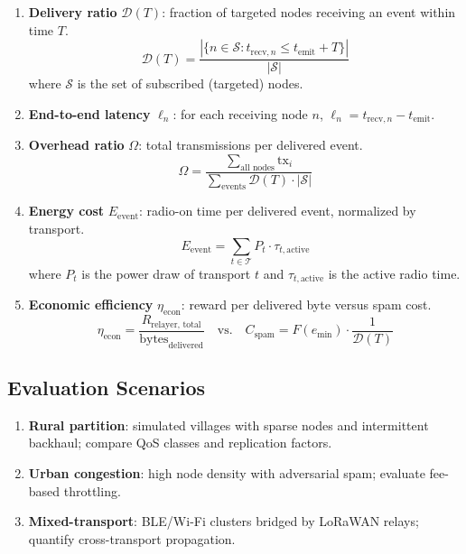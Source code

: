 \documentclass[11pt,a4paper]{article}
\begin{document}
\begin{enumerate}[nosep]
  \item \textbf{Delivery ratio} $\mathcal{D}(T)$: fraction of targeted nodes receiving an event within time $T$.
  \begin{equation}
    \mathcal{D}(T) = \frac{|\{n \in \mathcal{S} : t_{\text{recv},n} \leq t_{\text{emit}} + T\}|}{|\mathcal{S}|}
    \label{eq:delivery_ratio}
  \end{equation}
  where $\mathcal{S}$ is the set of subscribed (targeted) nodes.
  
  \item \textbf{End-to-end latency} $\ell_n$: for each receiving node $n$, $\ell_n = t_{\text{recv},n} - t_{\text{emit}}$.
  
  \item \textbf{Overhead ratio} $\Omega$: total transmissions per delivered event.
  \begin{equation}
    \Omega = \frac{\sum_{\text{all nodes}} \text{tx}_i}{\sum_{\text{events}} \mathcal{D}(T) \cdot |\mathcal{S}|}
    \label{eq:overhead}
  \end{equation}
  
  \item \textbf{Energy cost} $E_{\text{event}}$: radio-on time per delivered event, normalized by transport.
  \begin{equation}
    E_{\text{event}} = \sum_{t \in \mathcal{T}} P_t \cdot \tau_{t,\text{active}}
    \label{eq:energy}
  \end{equation}
  where $P_t$ is the power draw of transport $t$ and $\tau_{t,\text{active}}$ is the active radio time.
  
  \item \textbf{Economic efficiency} $\eta_{\text{econ}}$: reward per delivered byte versus spam cost.
  \begin{equation}
    \eta_{\text{econ}} = \frac{R_{\text{relayer, total}}}{\text{bytes}_{\text{delivered}}} \quad \text{vs.} \quad C_{\text{spam}} = F(e_{\text{min}}) \cdot \frac{1}{\mathcal{D}(T)}
    \label{eq:econ_efficiency}
  \end{equation}
\end{enumerate}

\subsection{Evaluation Scenarios}
\begin{enumerate}[nosep]
  \item \textbf{Rural partition}: simulated villages with sparse nodes and intermittent backhaul; compare QoS classes and replication factors.
  \item \textbf{Urban congestion}: high node density with adversarial spam; evaluate fee-based throttling.
  \item \textbf{Mixed-transport}: BLE/Wi-Fi clusters bridged by LoRaWAN relays; quantify cross-transport propagation.
\end{enumerate}
\end{document}
